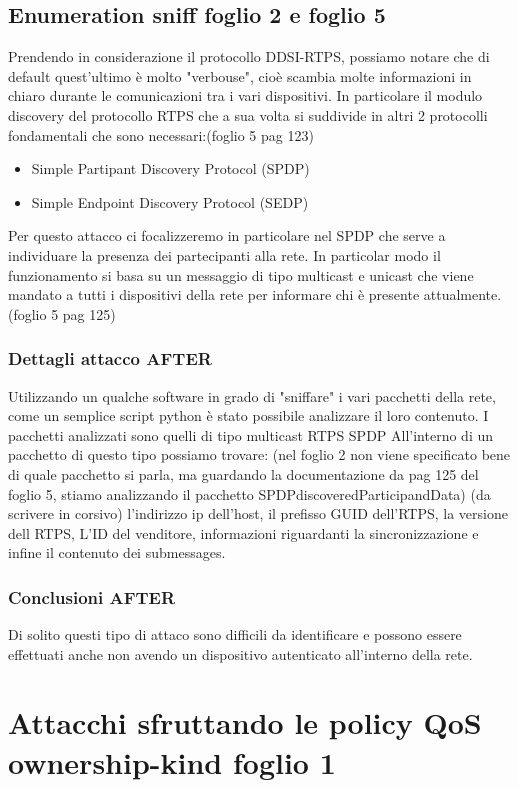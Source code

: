 \subsection{Enumeration sniff foglio 2 e foglio 5}
Prendendo in considerazione il protocollo DDSI-RTPS, possiamo notare che di
default quest'ultimo è molto "verbouse", cioè scambia molte informazioni in
chiaro durante le comunicazioni tra i vari dispositivi. In particolare
il modulo discovery del protocollo RTPS che a sua volta si suddivide in
altri 2 protocolli fondamentali che sono necessari:(foglio 5 pag 123)
\begin{itemize}
    \item Simple Partipant Discovery Protocol (SPDP)
    \item Simple Endpoint Discovery Protocol (SEDP)
\end{itemize}
Per questo attacco ci focalizzeremo in particolare nel SPDP che serve a
individuare la presenza dei partecipanti alla rete. In particolar modo
il funzionamento si basa su un messaggio di tipo multicast e unicast che viene
mandato a tutti i dispositivi della rete per informare chi è presente attualmente.
(foglio 5 pag 125)

\subsubsection{Dettagli attacco AFTER}
Utilizzando un qualche software in grado di "sniffare" i vari pacchetti della
rete, come un semplice script python è stato possibile analizzare il loro
contenuto. I pacchetti analizzati sono quelli di tipo multicast RTPS SPDP
All'interno di un pacchetto di questo tipo possiamo trovare: (nel foglio 2 
non viene specificato bene di quale pacchetto si parla, ma guardando la documentazione
da pag 125 del foglio 5, stiamo analizzando il pacchetto SPDPdiscoveredParticipandData)
(da scrivere in corsivo) l'indirizzo ip dell'host, il prefisso GUID dell'RTPS,
la versione dell RTPS, L'ID del venditore, informazioni riguardanti la sincronizzazione
e infine il contenuto dei submessages.


\subsubsection{Conclusioni AFTER}
Di solito questi tipo di attaco sono difficili da identificare e possono essere
effettuati anche non avendo un dispositivo autenticato all'interno della rete.

\section{Attacchi sfruttando le policy QoS ownership-kind foglio 1}

